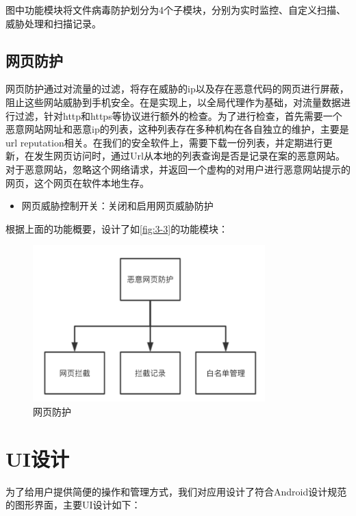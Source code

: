 \documentclass[format=final, language=chinese, degree=fyp]{hustthesis}
\begin{document}
图中功能模块将文件病毒防护划分为4个子模块，分别为实时监控、自定义扫描、威胁处理和扫描记录。



\subsection{网页防护}

网页防护通过对流量的过滤，将存在威胁的ip以及存在恶意代码的网页进行屏蔽，阻止这些网站威胁到手机安全。在是实现上，以全局代理作为基础，对流量数据进行过滤，针对http和https等协议进行额外的检查。为了进行检查，首先需要一个恶意网站网址和恶意ip的列表，这种列表存在多种机构在各自独立的维护，主要是url reputation相关。在我们的安全软件上，需要下载一份列表，并定期进行更新，在发生网页访问时，通过Url从本地的列表查询是否是记录在案的恶意网站。对于恶意网站，忽略这个网络请求，并返回一个虚构的对用户进行恶意网站提示的网页，这个网页在软件本地生存。


\begin{itemize}
    \item 网页威胁控制开关：关闭和启用网页威胁防护
\end{itemize}

根据上面的功能概要，设计了如\autoref{fig:3-3}的功能模块：
\begin{figure}[!h]
\centering
\includegraphics[width=0.8\textwidth]{function_3.png}
\caption{网页防护}\label{fig:3-3}
\end{figure}

\section{UI设计}


为了给用户提供简便的操作和管理方式，我们对应用设计了符合Android设计规范的图形界面，主要UI设计如下：
\end{document}
